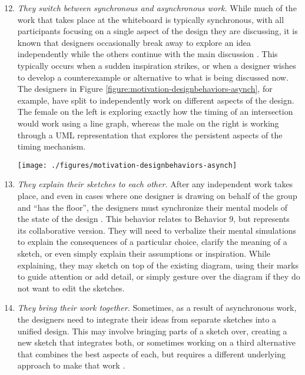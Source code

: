 \documentclass[12pt,fleqn]{ucithesis}
\begin{document}
\begin{enumerate}
  \setcounter{enumi}{11}
  \item \emph{They switch between synchronous and asynchronous work.} While much of the work that takes place at the whiteboard is typically synchronous, with all participants focusing on a single aspect of the design they are discussing, it is known that designers occasionally break away to explore an idea independently while the others continue with the main discussion \cite{dekel2005supporting}. This typically occurs when a sudden inspiration strikes, or when a designer wishes to develop a counterexample or alternative to what is being discussed now. The designers in Figure \ref{figure:motivation-designbehaviors-asynch}, for example, have split to independently work on different aspects of the design. The female on the left is exploring exactly how the timing of an intersection would work using a line graph, whereas the male on the right is working through a UML representation that explores the persistent aspects of the timing mechanism.

 \begin{figure*}[tbh]
  \centering
  \texttt{[image: ./figures/motivation-designbehaviors-asynch]}
  \caption{Designers sometimes break into independent groups to work out solutions, before later synchronizing their insights.}
  \label{figure:motivation-designbehaviors-asynch}
\end{figure*} 

 \item \emph{They explain their sketches to each other.} After any independent work takes place, and even in cases where one designer is drawing on behalf of the group and ``has the floor'', the designers must synchronize their mental models of the state of the design \cite{dekel2007notation}. This behavior relates to Behavior 9, but represents its collaborative version. They will need to verbalize their mental simulations to explain the consequences of a particular choice, clarify the meaning of a sketch, or even simply explain their assumptions or inspiration. While explaining, they may sketch on top of the existing diagram, using their marks to guide attention or add detail, or simply gesture over the diagram if they do not want to edit the sketches.

 \item \emph{They bring their work together.} Sometimes, as a result of asynchronous work, the designers need to integrate their ideas from separate sketches into a unified design. This may involve bringing parts of a sketch over, creating a new sketch that integrates both, or sometimes working on a third alternative that combines the best aspects of each, but requires a different underlying approach to make that work \cite{dekel2007notation}.
\end{enumerate}
\end{document}

